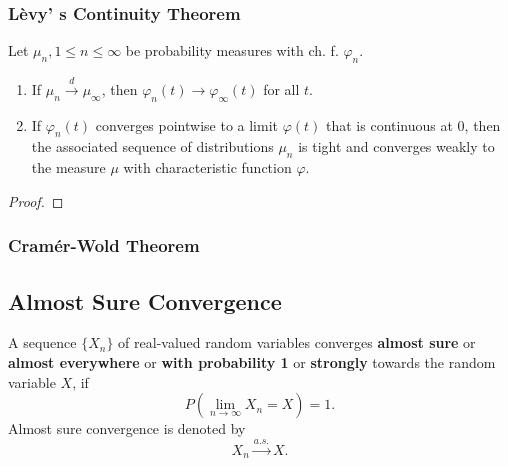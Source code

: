 \subsubsection{L\`evy' s Continuity Theorem}

\begin{theorem}
	Let $\mu_{n},1\leq n\leq\infty$ be probability measures with ch. f. $\varphi_{n}$.
	\begin{enumerate}
		\item If $\mu_{n}\stackrel{d}{\rightarrow}\mu_{\infty}$, then $\varphi_{n}(t)\rightarrow\varphi_{\infty}(t)$ for all $t$.
		\item If $\varphi_{n}(t)$ converges pointwise to a limit $\varphi(t)$ that is continuous at $0$, then the associated sequence of distributions $\mu_{n}$ is tight and converges weakly to the measure $\mu$ with characteristic function $\varphi$.
	\end{enumerate}
\end{theorem}

\begin{proof}

\end{proof}

\subsubsection{Cram\'er-Wold Theorem}

\begin{theorem} \label{thm:cramer-wold-theorem}

\end{theorem}

\subsection{Almost Sure Convergence}

\begin{definition}
	A sequence $\{X_n\}$ of real-valued random variables converges \textbf{almost sure} or \textbf{almost everywhere} or \textbf{with probability 1} or \textbf{strongly} towards the random variable $X$, if
	\begin{equation}
		P\left(\lim_{n\to\infty}X_n=X\right)=1.
	\end{equation}
	Almost sure convergence is denoted by
	\begin{equation}
		X_n \stackrel{a.s.}{\rightarrow} X.
	\end{equation}
\end{definition}

